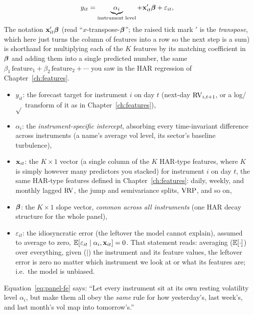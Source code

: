 \begin{equation}\label{eq:panel-fe}
  y_{it} = \underbrace{\alpha_i}_{\text{instrument level}}
           + \mathbf{x}_{it}'\bm{\beta} + \varepsilon_{it},
\end{equation}
The notation $\mathbf{x}_{it}'\bm{\beta}$ (read ``$x$-transpose-$\bm{\beta}$''; the raised tick
mark $'$ is the \emph{transpose}, which here just turns the column of features into
a row so the next step is a sum) is shorthand for multiplying each of the $K$
features by its matching coefficient in $\bm{\beta}$ and adding them into a single
predicted number, the same $\beta_1\,\text{feature}_1 + \beta_2\,\text{feature}_2
+ \cdots$ you saw in the HAR regression of Chapter~\ref{ch:features}.
\begin{itemize}[nosep]
  \item $y_{it}$: the forecast target for instrument $i$ on day $t$ (next-day
        $\operatorname{RV}_{i,t+1}$, or a log/$\sqrt{}$ transform of it as in
        Chapter~\ref{ch:features}),
  \item $\alpha_i$: the \emph{instrument-specific intercept}, absorbing every
        time-invariant difference across instruments (a name's average vol level,
        its sector's baseline turbulence),
  \item $\mathbf{x}_{it}$: the $K\times1$ vector (a single column of the $K$ HAR-type
        features, where $K$ is simply however many predictors you stacked) for
        instrument $i$ on day $t$, the same HAR-type features defined in
        Chapter~\ref{ch:features}: daily, weekly, and monthly lagged $\operatorname{RV}$, the
        jump and semivariance splits, $\operatorname{VRP}$, and so on,
  \item $\bm{\beta}$: the $K\times1$ slope vector, \emph{common across all
        instruments} (one HAR decay structure for the whole panel),
  \item $\varepsilon_{it}$: the idiosyncratic error (the leftover the model
        cannot explain), assumed to average to zero,
        $\mathbb{E}[\varepsilon_{it}\mid\alpha_i,\mathbf{x}_{it}] = 0$.  That statement reads:
        averaging ($\mathbb{E}[\cdot]$) over everything, given ($\mid$) the instrument and
        its feature values, the leftover error is zero no matter which instrument
        we look at or what its features are; i.e.\ the model is unbiased.
\end{itemize}

\begin{intuition}
Equation~\eqref{eq:panel-fe} says: ``Let every instrument sit at its own resting
volatility level $\alpha_i$, but make them all obey the \emph{same} rule for how
yesterday's, last week's, and last month's vol map into tomorrow's.''
\end{intuition}

